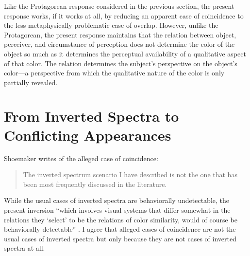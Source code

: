 \documentclass[12pt]{article}
\begin{document}
Like the Protagorean response considered in the previous section, the present response works, if it works at all, by reducing an apparent case of coincidence to the less metaphysically problematic case of overlap. However, unlike the Protagorean, the present response maintains that the relation between object, perceiver, and circumstance of perception does not determine the color of the object so much as it determines the perceptual availability of a qualitative aspect of that color. The relation determines the subject's perspective on the object's color---a perspective from which the qualitative nature of the color is only partially revealed.


\section{From Inverted Spectra to Conflicting Appearances}\label{sec:conclusion}


Shoemaker writes of the alleged case of coincidence: 
\begin{quote}
	The inverted spectrum scenario I have described is not the one that has been most frequently discussed in the literature. \citep[270]{Shoemaker:wk} 
\end{quote}
While the usual cases of inverted spectra are behaviorally undetectable, the present inversion ``which involves visual systems that differ somewhat in the relations they `select' to be the relations of color similarity, would of course be behaviorally detectable'' \citep[270]{Shoemaker:wk}. I agree that alleged cases of coincidence are not the usual cases of inverted spectra but only because they are not cases of inverted spectra at all.
\end{document}
